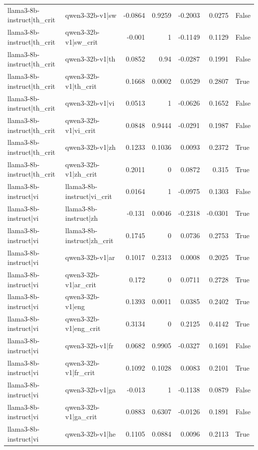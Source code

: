 \begin{table}
\begin{tabular}{l l r r r r l}
llama3-8b-instruct|th_crit & qwen3-32b-v1|sw & -0.0864 & 0.9259 & -0.2003 & 0.0275 & False \\
llama3-8b-instruct|th_crit & qwen3-32b-v1|sw_crit & -0.001 & 1 & -0.1149 & 0.1129 & False \\
llama3-8b-instruct|th_crit & qwen3-32b-v1|th & 0.0852 & 0.94 & -0.0287 & 0.1991 & False \\
llama3-8b-instruct|th_crit & qwen3-32b-v1|th_crit & 0.1668 & 0.0002 & 0.0529 & 0.2807 & True \\
llama3-8b-instruct|th_crit & qwen3-32b-v1|vi & 0.0513 & 1 & -0.0626 & 0.1652 & False \\
llama3-8b-instruct|th_crit & qwen3-32b-v1|vi_crit & 0.0848 & 0.9444 & -0.0291 & 0.1987 & False \\
llama3-8b-instruct|th_crit & qwen3-32b-v1|zh & 0.1233 & 0.1036 & 0.0093 & 0.2372 & True \\
llama3-8b-instruct|th_crit & qwen3-32b-v1|zh_crit & 0.2011 & 0 & 0.0872 & 0.315 & True \\
llama3-8b-instruct|vi & llama3-8b-instruct|vi_crit & 0.0164 & 1 & -0.0975 & 0.1303 & False \\
llama3-8b-instruct|vi & llama3-8b-instruct|zh & -0.131 & 0.0046 & -0.2318 & -0.0301 & True \\
llama3-8b-instruct|vi & llama3-8b-instruct|zh_crit & 0.1745 & 0 & 0.0736 & 0.2753 & True \\
llama3-8b-instruct|vi & qwen3-32b-v1|ar & 0.1017 & 0.2313 & 0.0008 & 0.2025 & True \\
llama3-8b-instruct|vi & qwen3-32b-v1|ar_crit & 0.172 & 0 & 0.0711 & 0.2728 & True \\
llama3-8b-instruct|vi & qwen3-32b-v1|eng & 0.1393 & 0.0011 & 0.0385 & 0.2402 & True \\
llama3-8b-instruct|vi & qwen3-32b-v1|eng_crit & 0.3134 & 0 & 0.2125 & 0.4142 & True \\
llama3-8b-instruct|vi & qwen3-32b-v1|fr & 0.0682 & 0.9905 & -0.0327 & 0.1691 & False \\
llama3-8b-instruct|vi & qwen3-32b-v1|fr_crit & 0.1092 & 0.1028 & 0.0083 & 0.2101 & True \\
llama3-8b-instruct|vi & qwen3-32b-v1|ga & -0.013 & 1 & -0.1138 & 0.0879 & False \\
llama3-8b-instruct|vi & qwen3-32b-v1|ga_crit & 0.0883 & 0.6307 & -0.0126 & 0.1891 & False \\
llama3-8b-instruct|vi & qwen3-32b-v1|he & 0.1105 & 0.0884 & 0.0096 & 0.2113 & True \\

\end{tabular}
\end{table}
